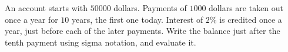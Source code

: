 An account starts with $50000$ dollars. Payments of $1000$ dollars are taken out once a year for $10$ years, the first one today. Interest of $2\%$ is credited once a year, just before each of the later payments. Write the balance just after the tenth payment using sigma notation, and evaluate it.
